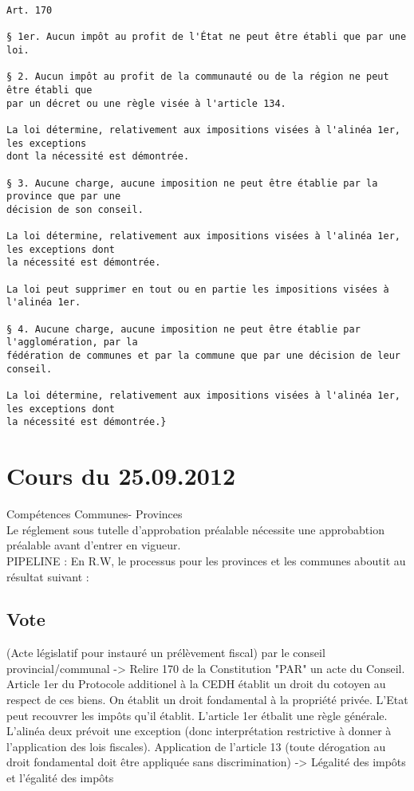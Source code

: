 \documentclass{book}
\begin{document}
\begin{verbatim}
Art. 170

§ 1er. Aucun impôt au profit de l'État ne peut être établi que par une loi.

§ 2. Aucun impôt au profit de la communauté ou de la région ne peut être établi que 
par un décret ou une règle visée à l'article 134.

La loi détermine, relativement aux impositions visées à l'alinéa 1er, les exceptions 
dont la nécessité est démontrée.

§ 3. Aucune charge, aucune imposition ne peut être établie par la province que par une
décision de son conseil.

La loi détermine, relativement aux impositions visées à l'alinéa 1er, les exceptions dont
la nécessité est démontrée.

La loi peut supprimer en tout ou en partie les impositions visées à l'alinéa 1er.

§ 4. Aucune charge, aucune imposition ne peut être établie par l'agglomération, par la 
fédération de communes et par la commune que par une décision de leur conseil.

La loi détermine, relativement aux impositions visées à l'alinéa 1er, les exceptions dont 
la nécessité est démontrée.}

\end{verbatim}

\chapter{Cours du 25.09.2012}

Compétences Communes- Provinces\\

Le réglement sous tutelle d'approbation préalable nécessite une approbabtion préalable avant d'entrer en vigueur.\\

PIPELINE : En R.W, le processus pour les provinces et les communes aboutit au résultat suivant :


\section{Vote} 

(Acte législatif pour instauré un prélèvement fiscal) par le conseil provincial/communal -> Relire 170 de la Constitution "PAR" un acte du Conseil.\\

Article 1er du Protocole additionel à la CEDH établit un droit du cotoyen au respect de ces biens. On établit un droit fondamental à la propriété privée. L'Etat peut recouvrer les impôts qu'il établit. L'article 1er étbalit une règle générale. L'alinéa deux prévoit une exception (donc interprétation restrictive à donner à l'application des lois fiscales). Application de l'article 13 (toute dérogation au droit fondamental doit être appliquée sans discrimination) -> Légalité des impôts et l'égalité des impôts\\
\end{document}
